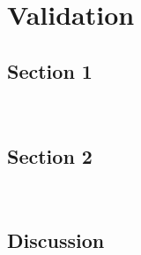 

\chapter{Validation}
\label{chap:validation}

\lipsum[25]

\minitoc

\newpage

\section{Section 1}

\lipsum[26] \\ \lipsum[27]

\section{Section 2}

\lipsum[28] \\ \lipsum[29]

\section{Discussion}

\lipsum[30]